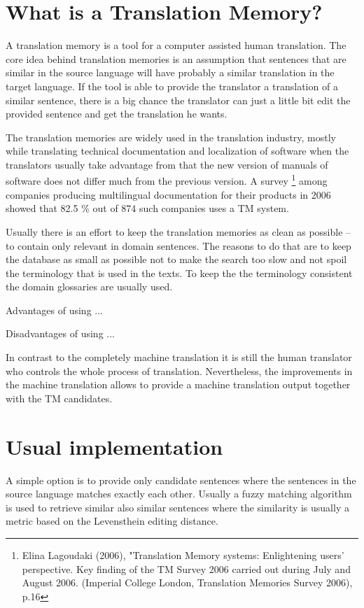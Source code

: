 \section{What is a Translation Memory?}

A translation memory is a tool for a computer assisted human translation.
 The core idea behind translation memories is an assumption that sentences that are similar in the source language will have probably a similar translation in the target language. If the tool is able to provide the translator a translation of a similar sentence, there is a big chance the translator can just a little bit edit the provided sentence and get the translation he wants.

The translation memories are widely used in the translation industry, mostly while translating technical documentation and localization of software when the translators usually take advantage from that the new version of manuals of software does not differ much from the previous version. A survey \footnote{Elina Lagoudaki (2006), "Translation Memory systems: Enlightening users' perspective. Key finding of the TM Survey 2006 carried out during July and August 2006. (Imperial College London, Translation Memories Survey 2006), p.16} among companies producing multilingual documentation for their products in 2006 showed that 82.5 \% out of 874 such companies uses a TM system.

Usually there is an effort to keep the translation memories as clean as possible -- to contain only relevant in domain sentences. The reasons to do that are to keep the database as small as possible not to make the search too slow and not spoil the terminology that is used in the texts. To keep the the terminology consistent the domain glossaries are usually used.

Advantages of using ...

Disadvantages of using ...

In contrast to the completely machine translation it is still the human translator who controls the whole process of translation. Nevertheless, the improvements in the machine translation allows to provide a machine translation output together with the TM candidates.

\section{Usual implementation}

A simple option is to provide only candidate sentences where the sentences in the source language matches exactly each other. Usually a fuzzy matching algorithm is used to retrieve similar also similar sentences where the similarity is usually a metric based on the Levensthein editing distance.

